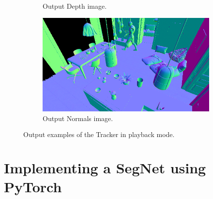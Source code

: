\begin{figure}
\begin{subfigure}[b]{0.475\textwidth}
		\caption[Output Depth image.]%
		{{\small Output Depth image.}}    
		\label{fig:generated_depth}
	\end{subfigure}
	\quad
	\begin{subfigure}[b]{0.475\textwidth}   
		\centering 
		\includegraphics[width=\textwidth]{archivos/generated_normals.png}
		\caption[Output Normals image.]%
		{{\small Output Normals image.}}    
		\label{fig:generated_normals}
	\end{subfigure}
	\caption{Output examples of the Tracker in playback mode.}
	\label{fig:playback_output}
\end{figure}

\section{Implementing a SegNet using PyTorch}
\label{sec:segnet}



